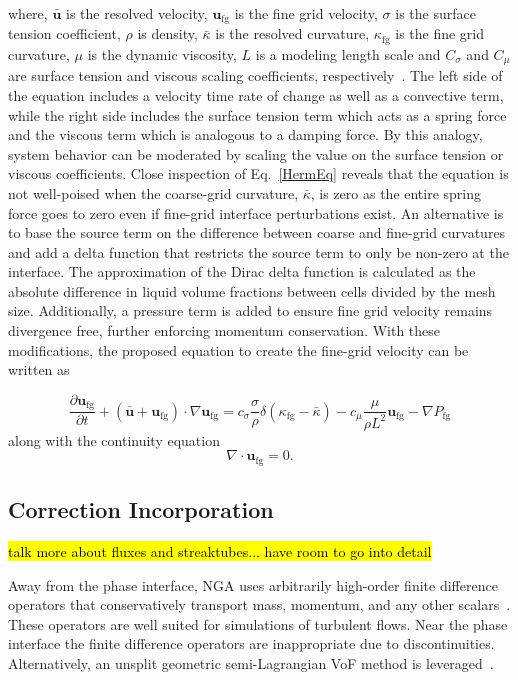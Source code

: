 where, $\bar{\bm{u}}$ is the resolved velocity,
$\bm{u}_{\text{fg}}$ is the fine grid velocity,
$\sigma$ is the surface tension coefficient,
$\rho$ is density, 
$\bar{\kappa}$ is the resolved curvature,
$\kappa_{\text{fg}}$ is the fine grid curvature,
$\mu$ is the dynamic viscosity,
$L$ is a modeling length scale and
$C_\sigma$ and
$C_\mu$ are surface tension and viscous scaling coefficients, respectively~\cite{Herrmann2013}. 
The left side of the equation includes a velocity time rate of change as well as a convective term, while the right side includes the surface tension term which acts as a spring force and the viscous term which is analogous to a damping force. By this analogy, system behavior can be moderated by scaling the value on the surface tension or viscous coefficients. Close inspection of Eq.~\ref{HermEq} reveals that the equation is not well-poised when the coarse-grid curvature, $\bar{\kappa}$, is zero as the entire spring force goes to zero even if fine-grid interface perturbations exist.  An alternative is to base the source term on the difference between coarse and fine-grid curvatures and add a delta function that restricts the source term to only be non-zero at the interface.  The approximation of the Dirac delta function is calculated as the absolute difference in liquid volume fractions between cells divided by the mesh size. Additionally, a pressure term is added to ensure fine grid velocity remains divergence free, further enforcing momentum conservation. With these modifications, the proposed equation to create the fine-grid velocity can be written as

\begin{equation}
\frac{\partial \bm{u}_{\text{fg}}}{\partial t} +
(\bar{\bm{u}}+\bm{u}_{\text{fg}}) \cdot \nabla \bm{u}_{\text{fg}} = 
c_{\sigma}\frac{\sigma}{\rho}\delta(\kappa_{\text{fg}}-\bar{\kappa})- 
c_{\mu}\frac{\mu}{\rho L^2}\bm{u}_{\text{fg}} -
\nabla P_{\text{fg}}\nonumber
\label{MyEq}
\end{equation}
along with the continuity equation
\begin{equation}
\nabla\cdot\bm{u}_\text{fg}=0.
\end{equation}

\subsection*{Correction Incorporation} 
\hl{talk more about fluxes and streaktubes... have room to go into detail}

Away from the phase interface, NGA uses arbitrarily high-order finite difference operators that conservatively transport mass, momentum, and any other scalars~\cite{NGA2}.  These operators are well suited for simulations of turbulent flows.  Near the phase interface the finite difference operators are inappropriate due to discontinuities.  Alternatively, an unsplit geometric semi-Lagrangian VoF method is leveraged~\cite{Owkes2017,Owkes2014}.

